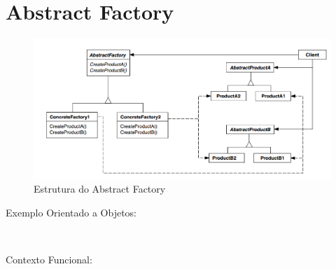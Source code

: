 \section{Abstract Factory}


\begin{figure}[htb]
	\caption{\label{fig_grafico}Estrutura do Abstract Factory}
	\begin{center}
	    \includegraphics[scale=0.5]{5_padroes-contexto-funcional/5.1_criacionais/5.1.2_abstract-factory/diagram.png}
	\end{center}
\end{figure}

Exemplo Orientado a Objetos:

\begin{lstlisting}[caption={Abstract Factory Orientado a Objetos},label=oostrategy]
    

\end{lstlisting}

Contexto Funcional:

\begin{lstlisting}[caption={Abstract Factory Funcional},label=fpabfactory]
    
    

\end{lstlisting}